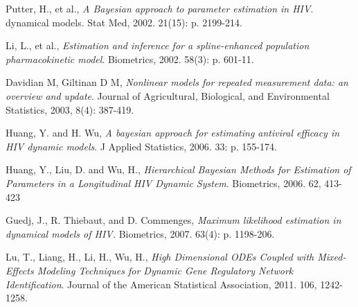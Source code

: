 \documentclass[12pt]{extarticle}
\begin{document}
\begin{thebibliography}{9}
Putter, H., et al., 
\emph{A Bayesian approach to parameter estimation in HIV}. 
dynamical models. Stat Med, 2002. 21(15): p. 2199-214.

Li, L., et al., 
\emph{Estimation and inference for a spline-enhanced population pharmacokinetic model}. 
Biometrics, 2002. 58(3): p. 601-11.

Davidian M, Giltinan D M, 
\emph{Nonlinear models for repeated measurement data: an overview and update}. 
Journal of Agricultural, Biological, and Environmental Statistics, 2003, 8(4): 387-419.

Huang, Y. and H. Wu, 
\emph{A bayesian approach for estimating antiviral efficacy in HIV dynamic models}. 
J Applied Statistics, 2006. 33: p. 155-174.

Huang, Y., Liu, D. and Wu, H., 
\emph{Hierarchical Bayesian Methods for Estimation of Parameters in a Longitudinal HIV Dynamic System}. 
Biometrics, 2006. 62, 413-423

Guedj, J., R. Thiebaut, and D. Commenges, 
\emph{Maximum likelihood estimation in dynamical models of HIV.} 
Biometrics, 2007. 63(4): p. 1198-206.

Lu, T., Liang, H., Li, H., Wu, H., 
\emph{High Dimensional ODEs Coupled with Mixed-Effects Modeling Techniques for Dynamic Gene Regulatory Network Identification}. 
Journal of the American Statistical Association, 2011. 106, 1242-1258.

\end{thebibliography}
\end{document}
